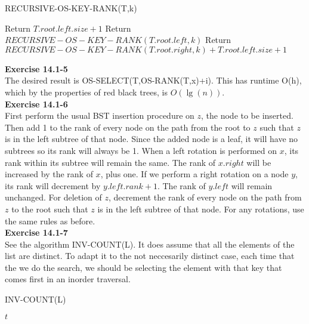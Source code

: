 \documentclass{article}
\begin{document}
\begin{algorithm}
\caption{RECURSIVE-OS-KEY-RANK(T,k)}
\begin{algorithmic}[1]
	\State Return $T.root.left.size + 1$
	\State Return $RECURSIVE-OS-KEY-RANK(T.root.left, k)$
\Else
	\State Return $RECURSIVE-OS-KEY-RANK(T.root.right, k) + T.root.left.size + 1$
\EndIf
\end{algorithmic}
\end{algorithm}

\noindent\textbf{ Exercise 14.1-5} \\

The desired result is OS-SELECT(T,OS-RANK(T,x)+i). This has runtime O(h), which by the properties of red black trees, is $O(\lg(n))$.\\

\noindent\textbf{Exercise 14.1-6}\\

First perform the usual BST insertion procedure on $z$, the node to be inserted.  Then add 1 to the rank of every node on the path from the root to $z$ such that $z$ is in the left subtree of that node. Since the added node is a leaf, it will have no subtrees so its rank will always be 1.  When a left rotation is performed on $x$, its rank within its subtree will remain the same.  The rank of $x.right$ will be increased by the rank of $x$, plus one.  If we perform a right rotation on a node $y$, its rank will decrement by $y.left.rank + 1$.  The rank of $y.left$ will remain unchanged.  For deletion of $z$,  decrement the rank of every node on the path from $z$ to the root such that $z$ is in the left subtree of that node.  For any rotations, use the same rules as before.\\

\noindent\textbf{ Exercise 14.1-7} \\

See the algorithm INV-COUNT(L). It does assume that all the elements of the list are distinct. To adapt it to the not neccesarily distinct case, each time that the we do the search, we should be selecting the element with that key that comes first in an inorder traversal.\\


\begin{algorithm}
\caption{INV-COUNT(L)}
\begin{algorithmic}
\EndFor
\State \Return $t$
\end{algorithmic}
\end{algorithm}
\end{document}
